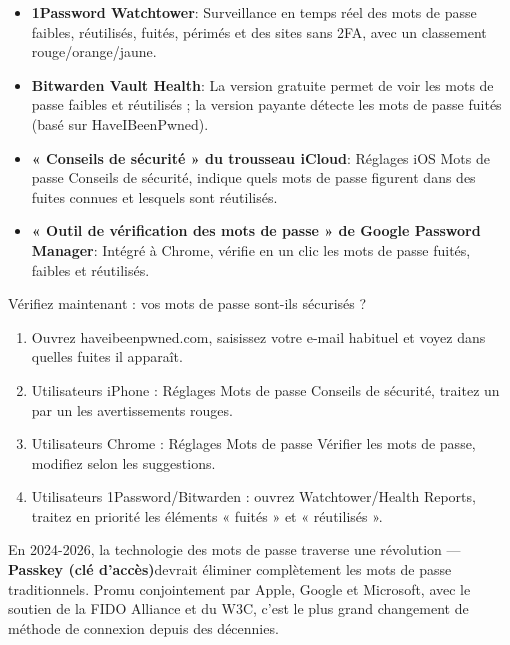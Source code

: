 
\begin{itemize}
  \item \textbf{1Password Watchtower}: Surveillance en temps réel des mots de passe faibles, réutilisés, fuités, périmés et des sites sans 2FA, avec un classement rouge/orange/jaune.
  \item \textbf{Bitwarden Vault Health}: La version gratuite permet de voir les mots de passe faibles et réutilisés ; la version payante détecte les mots de passe fuités (basé sur HaveIBeenPwned).
  \item \textbf{« Conseils de sécurité » du trousseau iCloud}: Réglages iOS Mots de passe Conseils de sécurité, indique quels mots de passe figurent dans des fuites connues et lesquels sont réutilisés.
  \item \textbf{« Outil de vérification des mots de passe » de Google Password Manager}: Intégré à Chrome, vérifie en un clic les mots de passe fuités, faibles et réutilisés.
\end{itemize}

\begin{tcbpractice}{Vérifiez maintenant : vos mots de passe sont-ils sécurisés ?}
\begin{enumerate}
  \item Ouvrez haveibeenpwned.com, saisissez votre e-mail habituel et voyez dans quelles fuites il apparaît.
  \item Utilisateurs iPhone : Réglages Mots de passe Conseils de sécurité, traitez un par un les avertissements rouges.
  \item Utilisateurs Chrome : Réglages Mots de passe Vérifier les mots de passe, modifiez selon les suggestions.
  \item Utilisateurs 1Password/Bitwarden : ouvrez Watchtower/Health Reports, traitez en priorité les éléments « fuités » et « réutilisés ».
\end{enumerate}

\end{tcbpractice}


En 2024-2026, la technologie des mots de passe traverse une révolution —\textbf{Passkey (clé d'accès)}devrait éliminer complètement les mots de passe traditionnels. Promu conjointement par Apple, Google et Microsoft, avec le soutien de la FIDO Alliance et du W3C, c'est le plus grand changement de méthode de connexion depuis des décennies.

